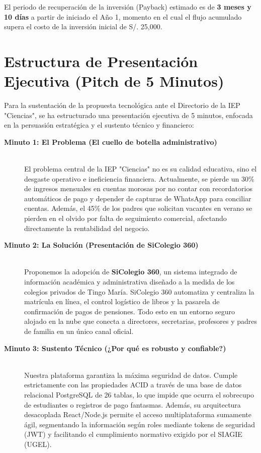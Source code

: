 \documentclass[12pt,a4paper,oneside]{report}
\begin{document}
El periodo de recuperación de la inversión (Payback) estimado es de \textbf{3 meses y 10 días} a partir de iniciado el Año 1, momento en el cual el flujo acumulado supera el costo de la inversión inicial de S/. 25,000.

\newpage

\section{Estructura de Presentación Ejecutiva (Pitch de 5 Minutos)}

Para la sustentación de la propuesta tecnológica ante el Directorio de la IEP "Ciencias", se ha estructurado una presentación ejecutiva de 5 minutos, enfocada en la persuasión estratégica y el sustento técnico y financiero:

\begin{description}
    \item[\textbf{Minuto 1: El Problema (El cuello de botella administrativo)}] \hfill \\
    El problema central de la IEP "Ciencias" no es su calidad educativa, sino el desgaste operativo e ineficiencia financiera. Actualmente, se pierde un 30\% de ingresos mensuales en cuentas morosas por no contar con recordatorios automáticos de pago y depender de capturas de WhatsApp para conciliar cuentas. Además, el 45\% de los padres que solicitan vacantes en verano se pierden en el olvido por falta de seguimiento comercial, afectando directamente la rentabilidad del negocio.
    
    \item[\textbf{Minuto 2: La Solución (Presentación de SiColegio 360)}] \hfill \\
    Proponemos la adopción de \textbf{SiColegio 360}, un sistema integrado de información académica y administrativa diseñado a la medida de los colegios privados de Tingo María. SiColegio 360 automatiza y centraliza la matrícula en línea, el control logístico de libros y la pasarela de confirmación de pagos de pensiones. Todo esto en un entorno seguro alojado en la nube que conecta a directores, secretarias, profesores y padres de familia en un único canal oficial.
    
    \item[\textbf{Minuto 3: Sustento Técnico (¿Por qué es robusto y confiable?)}] \hfill \\
    Nuestra plataforma garantiza la máxima seguridad de datos. Cumple estrictamente con las propiedades ACID a través de una base de datos relacional PostgreSQL de 26 tablas, lo que impide que ocurra el sobrecupo de estudiantes o registros de pago fantasmas. Además, su arquitectura desacoplada React/Node.js permite el acceso multiplataforma sumamente ágil, segmentando la información según roles mediante tokens de seguridad (JWT) y facilitando el cumplimiento normativo exigido por el SIAGIE (UGEL).
    

\end{description}
\end{document}
